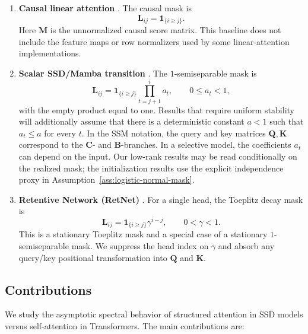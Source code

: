 \documentclass{article}
\newcommand{\one}{\mathbf{1}}
\newcommand{\bB}{\mathbf{B}}
\newcommand{\bC}{\mathbf{C}}
\newcommand{\bM}{\mathbf{M}}
\newcommand{\bL}{\mathbf{L}}
\newcommand{\bQ}{\mathbf{Q}}
\newcommand{\bK}{\mathbf{K}}
\theoremstyle{definition}
\theoremstyle{remark}
\begin{document}
\begin{enumerate}
\item \textbf{Causal linear attention} \citep{linear_attn}.  The causal mask is
\[
    \bL_{ij}=\one_{\{i\geq j\}}.
\]
Here $\bM$ is the unnormalized causal score matrix.  This baseline does not
include the feature maps or row normalizers used by some linear-attention
implementations.

\item \textbf{Scalar SSD/Mamba transition} \citep{mamba1,mamba2}.  The
\(1\)-semiseparable mask is
\begin{equation}
    \bL_{ij}
    =
    \one_{\{i\geq j\}}\prod_{t=j+1}^{i}a_t,
    \qquad 0\leq a_t<1,
    \label{eq:semiseparable-mask}
\end{equation}
with the empty product equal to one.  Results that require uniform stability
will additionally assume that there is a deterministic constant $a<1$ such
that $a_t\leq a$ for every $t$.  In the SSM notation, the query and key matrices
\(\bQ,\bK\) correspond to the \(\bC\)- and \(\bB\)-branches.  In a selective
model, the coefficients $a_t$ can depend on the input.  Our low-rank results
may be read conditionally on the realized mask; the initialization results use
the explicit independence proxy in Assumption~\ref{ass:logistic-normal-mask}.

\item \textbf{Retentive Network (RetNet)} \citep{sun:2023retentive}.  For a
single head, the Toeplitz decay mask is
\[
    \bL_{ij}=\one_{\{i\geq j\}}\gamma^{i-j},
    \qquad 0<\gamma<1.
\]
This is a stationary Toeplitz mask and a special case of a stationary
$1$-semiseparable mask.  We suppress the head index on $\gamma$ and absorb any
query/key positional transformation into $\bQ$ and $\bK$.
\end{enumerate}

\subsection{Contributions}
We study the asymptotic spectral behavior of structured attention in SSD models versus self-attention in Transformers. The main contributions are:
\end{document}
